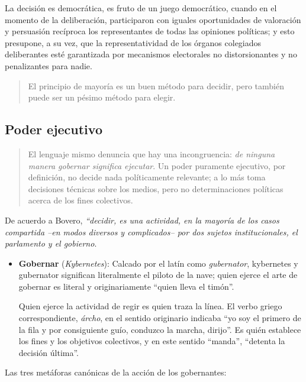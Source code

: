 \documentclass[
  letterpaper,
  DIV=11,
  numbers=noendperiod]{scrreprt}
\begin{document}
La decisión es democrática, es fruto de un juego democrático, cuando en
el momento de la deliberación, participaron con iguales oportunidades de
valoración y persuasión recíproca los representantes de todas las
opiniones políticas; y esto presupone, a su vez, que la
representatividad de los órganos colegiados deliberantes esté
garantizada por mecanismos electorales no distorsionantes y no
penalizantes para nadie.

\begin{quote}
El principio de mayoría es un buen método para decidir, pero también
puede ser un pésimo método para elegir.
\end{quote}

\subsection{Poder ejecutivo}\label{poder-ejecutivo}

\begin{quote}
El lenguaje mismo denuncia que hay una incongruencia: \emph{de ninguna
manera gobernar significa ejecutar}. Un poder puramente ejecutivo, por
definición, no decide nada políticamente relevante; a lo más toma
decisiones técnicas sobre los medios, pero no determinaciones políticas
acerca de los fines colectivos.
\end{quote}

De acuerdo a Bovero, \emph{``decidir, es una actividad, en la mayoría de
los casos compartida --en modos diversos y complicados-- por dos sujetos
institucionales, el parlamento y el gobierno}.

\begin{itemize}
\item
  \textbf{Gobernar} (\emph{Kybernetes}): Calcado por el latín como
  \emph{gubernator}, kybernetes y gubernator significan literalmente el
  piloto de la nave; quien ejerce el arte de gobernar es literal y
  originariamente ``quien lleva el timón''.

  Quien ejerce la actividad de regir es quien traza la línea. El verbo
  griego correspondiente, \emph{árcho}, en el sentido originario
  indicaba ``yo soy el primero de la fila y por consiguiente guío,
  conduzco la marcha, dirijo''. Es quién establece los fines y los
  objetivos colectivos, y en este sentido ``manda'', ``detenta la
  decisión última''.
\end{itemize}

Las tres metáforas canónicas de la acción de los gobernantes:
\end{document}
